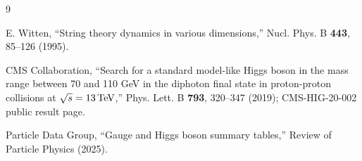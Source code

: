 \documentclass[11pt]{article}
\theoremstyle{plain}
\theoremstyle{definition}
\begin{document}
\begin{thebibliography}{9}

E. Witten,
``String theory dynamics in various dimensions,''
Nucl. Phys. B \textbf{443}, 85--126 (1995).

CMS Collaboration,
``Search for a standard model-like Higgs boson in the mass range between 70 and
110 GeV in the diphoton final state in proton-proton collisions at
\(\sqrt{s}=13\,{\rm TeV}\),''
Phys. Lett. B \textbf{793}, 320--347 (2019);
CMS-HIG-20-002 public result page.

Particle Data Group,
``Gauge and Higgs boson summary tables,''
Review of Particle Physics (2025).

\end{thebibliography}
\end{document}
